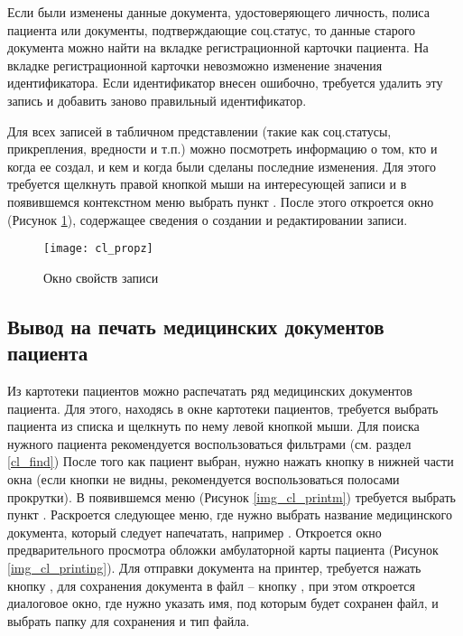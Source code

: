 Если были изменены данные документа, удостоверяющего личность, полиса пациента или документы, подтверждающие соц.статус, то данные старого документа можно найти на вкладке  регистрационной карточки пациента. 
На вкладке  регистрационной карточки невозможно изменение значения идентификатора. Если идентификатор внесен ошибочно, требуется удалить эту запись и добавить заново правильный идентификатор.

Для всех записей в табличном представлении (такие как соц.статусы, прикрепления, вредности и т.п.) можно посмотреть информацию о том, кто и когда ее создал, и кем и когда были сделаны последние изменения. Для этого требуется щелкнуть правой кнопкой мыши на интересующей записи и в появившемся контекстном меню выбрать пункт . После этого откроется окно (Рисунок \ref{img_cl_propz}), содержащее сведения о создании и редактировании записи.

\begin{figure}[ht]\centering
 \texttt{[image: cl\_propz]}
 \caption{Окно свойств записи}
 \label{img_cl_propz}
\end{figure} 

\subsection{Вывод на печать медицинских документов пациента}

Из картотеки пациентов можно распечатать ряд медицинских документов пациента. Для этого, находясь в окне картотеки пациентов, требуется выбрать пациента из списка и щелкнуть по нему левой кнопкой мыши. Для поиска нужного пациента рекомендуется воспользоваться фильтрами (см. раздел \ref{cl_find}) После того как пациент выбран, нужно нажать кнопку  в нижней части окна (если кнопки не видны, рекомендуется воспользоваться полосами прокрутки). В появившемся меню (Рисунок \ref{img_cl_printm}) требуется выбрать пункт . Раскроется следующее меню, где нужно выбрать название медицинского документа, который следует напечатать, например . Откроется окно предварительного просмотра обложки амбулаторной карты пациента (Рисунок \ref{img_cl_printing}). Для отправки документа на принтер, требуется нажать кнопку  , для сохранения документа в файл – кнопку  , при этом откроется диалоговое окно, где нужно указать имя, под которым будет сохранен файл, и выбрать папку для сохранения и тип файла.

